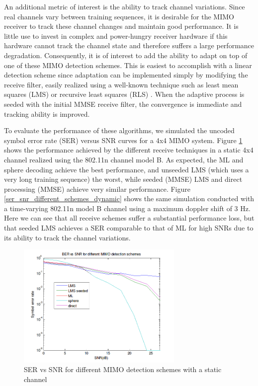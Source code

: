 \documentclass[journal]{IEEEtran}
\begin{document}
An additional metric of interest is the ability to track channel variations. Since real channels vary between training sequences, it is desirable for the MIMO receiver to track these channel changes and maintain good performance. It is little use to invest in complex and power-hungry receiver hardware if this hardware cannot track the channel state and therefore suffers a large performance degradation. Consequently, it is of interest to add the ability to adapt on top of one of these MIMO detection schemes. This is easiest to accomplish with a linear detection scheme since adaptation can be implemented simply by modifying the receive filter, easily realized using a well-known technique such as least mean squares (LMS) or recursive least squares (RLS) \cite{digital_bf, bf_notes}. When the adaptive process is seeded with the initial MMSE receive filter, the convergence is immediate and tracking ability is improved.

To evaluate the performance of these algorithms, we simulated the uncoded symbol error rate (SER) versus SNR curves for a 4x4 MIMO system. Figure \ref{ser_snr_different_schemes_static} shows the performance achieved by the different receive techniques in a static 4x4 channel realized using the 802.11n channel model B. As expected, the ML and sphere decoding achieve the best performance, and unseeded LMS (which uses a very long training sequence) the worst, while seeded (MMSE) LMS and direct processing (MMSE) achieve very similar performance. Figure \ref{ser_snr_different_schemes_dynamic} shows the same simulation conducted with a time-varying 802.11n model B channel using a maximum doppler shift of 3 Hz. Here we can see that all receive schemes suffer a substantial performance loss, but that seeded LMS achieves a SER comparable to that of ML for high SNRs due to its ability to track the channel variations. 

\begin{figure}
\centering
\includegraphics[width=8cm]{images/static_channel_decoder_comparison.png}
\caption{SER vs SNR for different MIMO detection schemes with a static channel}
\label{ser_snr_different_schemes_static}
\end{figure}
\end{document}
